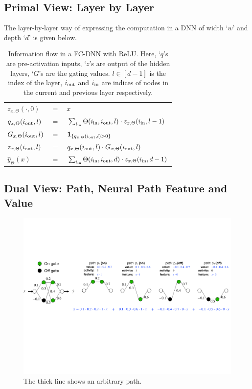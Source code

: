 \subsection{Primal View: Layer by Layer}\label{sec:primal}
The layer-by-layer way of expressing the computation in a DNN of width `$w$' and depth `$d$' is given below.
\begin{table}[h]
\centering
\begin{tabular}{| lll|}\hline
 $z_{x,\Theta}(\cdot,0)$ &$=$ &$x$ \\
 $q_{x,\Theta}(i_{\text{out}},l)$& $=$ & $\sum_{i_{\text{in}}}\Theta(i_{\text{in}},i_{\text{out}},l) \cdot z_{x,\Theta}(i_{\text{in}},l-1) $\\
$G_{x,\Theta}(i_{\text{out}},l)$& $=$ & $\mathbf{1}_{\{q_{x,\Theta}(i_{\text{out}},l)>0\}}$\\
 $z_{x,\Theta}(i_{\text{out}},l)$ & $=$ & $q_{x,\Theta}(i_{\text{out}},l)\cdot G_{x,\Theta}(i_{\text{out}},l)$\\
 $\hat{y}_{\Theta}(x)$ & $=$ & $\sum_{i_{\text{in}}}\Theta(i_{\text{in}},i_{\text{out}}, d)\cdot z_{x,\Theta}(i_{\text{in}},d-1)$\\\hline
\end{tabular}
\caption{\small{Information flow in a FC-DNN with ReLU. Here, `$q$'s are pre-activation inputs, `$z$'s are output of the hidden layers, `$G$'s are the gating values. $l\in[d-1]$ is the index of the layer, $i_{\text{out}}$ and $i_{\text{in}}$ are indices of  nodes in the current and previous layer respectively.}}
\label{tb:basic}
\end{table}

\subsection{Dual View: Path, Neural Path Feature and Value}\label{sec:dual}
\FloatBarrier
\begin{figure}[h]
\centering
\includegraphics[scale=0.32]{figs/paths.pdf}
\caption{The thick line shows an arbitrary path.}
\end{figure}

